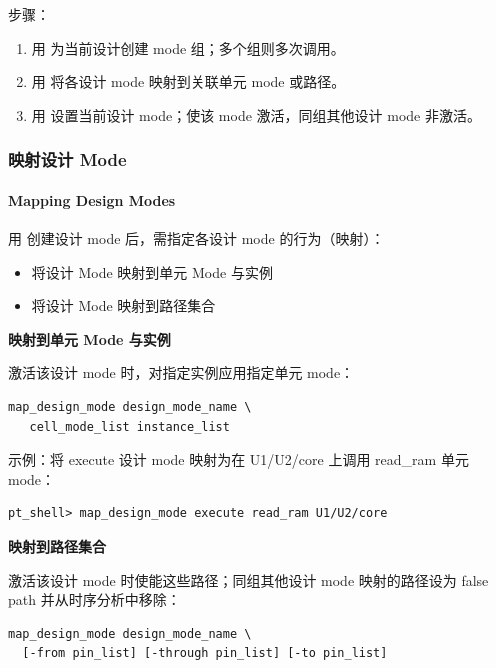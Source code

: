 步骤：
\begin{enumerate}
  \item 用  为当前设计创建 mode 组；多个组则多次调用。
  \item 用  将各设计 mode 映射到关联单元 mode 或路径。
  \item 用  设置当前设计 mode；使该 mode 激活，同组其他设计 mode 非激活。
\end{enumerate}


\subsubsection{映射设计 Mode}
\paragraph*{Mapping Design Modes}

用  创建设计 mode 后，需指定各设计 mode 的行为（映射）：
\begin{itemize}
  \item 将设计 Mode 映射到单元 Mode 与实例
  \item 将设计 Mode 映射到路径集合
\end{itemize}

\textbf{映射到单元 Mode 与实例}

激活该设计 mode 时，对指定实例应用指定单元 mode：
\begin{lstlisting}
map_design_mode design_mode_name \
   cell_mode_list instance_list
\end{lstlisting}

示例：将 execute 设计 mode 映射为在 U1/U2/core 上调用 read\_ram 单元 mode：
\begin{lstlisting}
pt_shell> map_design_mode execute read_ram U1/U2/core
\end{lstlisting}


\textbf{映射到路径集合}

激活该设计 mode 时使能这些路径；同组其他设计 mode 映射的路径设为 false path 并从时序分析中移除：
\begin{lstlisting}
map_design_mode design_mode_name \
  [-from pin_list] [-through pin_list] [-to pin_list]
\end{lstlisting}

